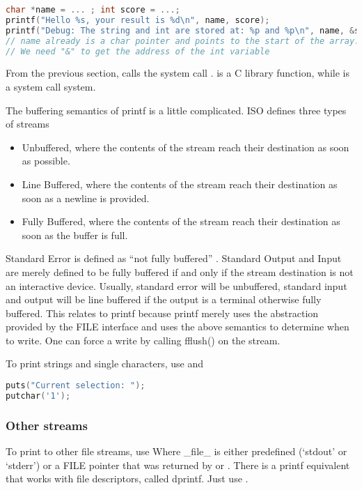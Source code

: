 \begin{lstlisting}[language=C]
char *name = ... ; int score = ...;
printf("Hello %s, your result is %d\n", name, score);
printf("Debug: The string and int are stored at: %p and %p\n", name, &score );
// name already is a char pointer and points to the start of the array.
// We need "&" to get the address of the int variable
\end{lstlisting}

From the previous section,
 calls the system call .
 is a C library function, while  is a system call system.

The buffering semantics of printf is a little complicated.
ISO defines three types of streams \cite[P. 278]{ISON1124}
\begin{itemize}
\item Unbuffered, where the contents of the stream reach their destination as soon as possible.
\item Line Buffered, where the contents of the stream reach their destination as soon as a newline is provided.
\item Fully Buffered, where the contents of the stream reach their destination as soon as the buffer is full.
\end{itemize}

Standard Error is defined as ``not fully buffered'' \cite[P. 279]{ISON1124}.
Standard Output and Input are merely defined to be fully buffered if and only if the stream destination is not an interactive device.
Usually, standard error will be unbuffered, standard input and output will be line buffered if the output is a terminal otherwise fully buffered.
This relates to printf because printf merely uses the abstraction provided by the FILE interface and uses the above semantics to determine when to write.
One can force a write by calling fflush() on the stream.

To print strings and single characters, use  and 

\begin{lstlisting}[language=C]
puts("Current selection: ");
putchar('1');
\end{lstlisting}

\subsubsection{Other streams}

To print to other file streams, use  Where \_file\_ is either predefined (`stdout' or `stderr') or a FILE pointer that was returned by  or .
There is a printf equivalent that works with file descriptors, called dprintf.
Just use .

